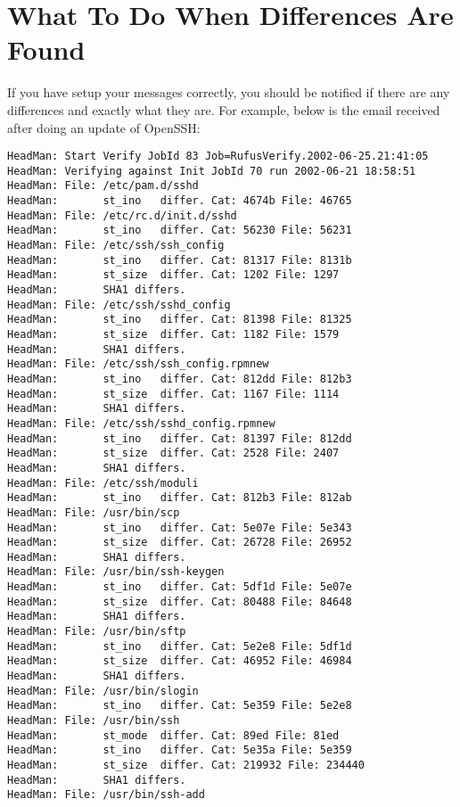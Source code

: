 \section{What To Do When Differences Are Found}

If you have setup your messages correctly, you should be notified if there are
any differences and exactly what they are. For example, below is the email
received after doing an update of OpenSSH:

\footnotesize
\begin{verbatim}
HeadMan: Start Verify JobId 83 Job=RufusVerify.2002-06-25.21:41:05
HeadMan: Verifying against Init JobId 70 run 2002-06-21 18:58:51
HeadMan: File: /etc/pam.d/sshd
HeadMan:       st_ino   differ. Cat: 4674b File: 46765
HeadMan: File: /etc/rc.d/init.d/sshd
HeadMan:       st_ino   differ. Cat: 56230 File: 56231
HeadMan: File: /etc/ssh/ssh_config
HeadMan:       st_ino   differ. Cat: 81317 File: 8131b
HeadMan:       st_size  differ. Cat: 1202 File: 1297
HeadMan:       SHA1 differs.
HeadMan: File: /etc/ssh/sshd_config
HeadMan:       st_ino   differ. Cat: 81398 File: 81325
HeadMan:       st_size  differ. Cat: 1182 File: 1579
HeadMan:       SHA1 differs.
HeadMan: File: /etc/ssh/ssh_config.rpmnew
HeadMan:       st_ino   differ. Cat: 812dd File: 812b3
HeadMan:       st_size  differ. Cat: 1167 File: 1114
HeadMan:       SHA1 differs.
HeadMan: File: /etc/ssh/sshd_config.rpmnew
HeadMan:       st_ino   differ. Cat: 81397 File: 812dd
HeadMan:       st_size  differ. Cat: 2528 File: 2407
HeadMan:       SHA1 differs.
HeadMan: File: /etc/ssh/moduli
HeadMan:       st_ino   differ. Cat: 812b3 File: 812ab
HeadMan: File: /usr/bin/scp
HeadMan:       st_ino   differ. Cat: 5e07e File: 5e343
HeadMan:       st_size  differ. Cat: 26728 File: 26952
HeadMan:       SHA1 differs.
HeadMan: File: /usr/bin/ssh-keygen
HeadMan:       st_ino   differ. Cat: 5df1d File: 5e07e
HeadMan:       st_size  differ. Cat: 80488 File: 84648
HeadMan:       SHA1 differs.
HeadMan: File: /usr/bin/sftp
HeadMan:       st_ino   differ. Cat: 5e2e8 File: 5df1d
HeadMan:       st_size  differ. Cat: 46952 File: 46984
HeadMan:       SHA1 differs.
HeadMan: File: /usr/bin/slogin
HeadMan:       st_ino   differ. Cat: 5e359 File: 5e2e8
HeadMan: File: /usr/bin/ssh
HeadMan:       st_mode  differ. Cat: 89ed File: 81ed
HeadMan:       st_ino   differ. Cat: 5e35a File: 5e359
HeadMan:       st_size  differ. Cat: 219932 File: 234440
HeadMan:       SHA1 differs.
HeadMan: File: /usr/bin/ssh-add

\end{verbatim}
